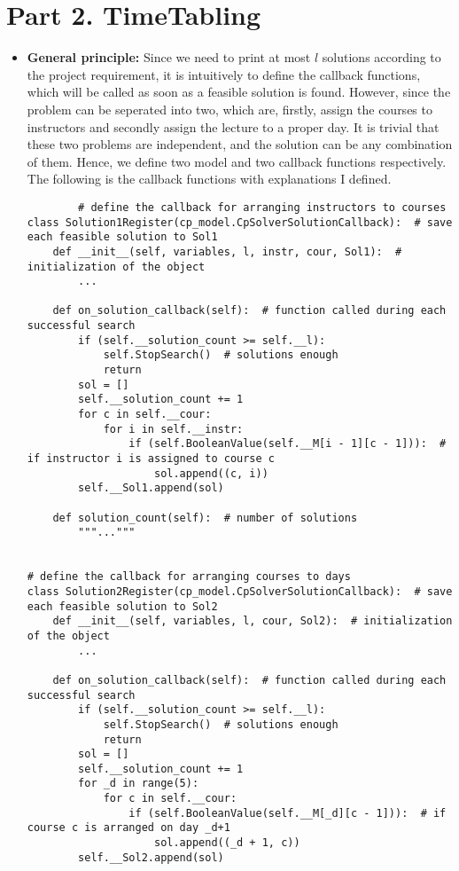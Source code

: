 \documentclass{article}
\begin{document}
\section*{Part 2. TimeTabling}
\begin{itemize}
    \item \textbf{General principle: }Since we need to print at most $l$ solutions according to the project requirement, it is intuitively to define the callback functions, which will be called as soon as a feasible solution is found. However, since the problem can be seperated into two, which are, firstly, assign the courses to instructors and secondly assign the lecture to a proper day. It is trivial that these two problems are independent, and the solution can be any combination of them. Hence, we define two model and two callback functions respectively. The following is the callback functions with explanations I defined. 
    \begin{verbatim}
        # define the callback for arranging instructors to courses
class Solution1Register(cp_model.CpSolverSolutionCallback):  # save each feasible solution to Sol1
    def __init__(self, variables, l, instr, cour, Sol1):  # initialization of the object
        ...

    def on_solution_callback(self):  # function called during each successful search
        if (self.__solution_count >= self.__l):
            self.StopSearch()  # solutions enough
            return
        sol = []
        self.__solution_count += 1
        for c in self.__cour:
            for i in self.__instr:
                if (self.BooleanValue(self.__M[i - 1][c - 1])):  # if instructor i is assigned to course c
                    sol.append((c, i))
        self.__Sol1.append(sol)

    def solution_count(self):  # number of solutions
        """..."""


# define the callback for arranging courses to days
class Solution2Register(cp_model.CpSolverSolutionCallback):  # save each feasible solution to Sol2
    def __init__(self, variables, l, cour, Sol2):  # initialization of the object
        ...

    def on_solution_callback(self):  # function called during each successful search
        if (self.__solution_count >= self.__l):
            self.StopSearch()  # solutions enough
            return
        sol = []
        self.__solution_count += 1
        for _d in range(5):
            for c in self.__cour:
                if (self.BooleanValue(self.__M[_d][c - 1])):  # if course c is arranged on day _d+1
                    sol.append((_d + 1, c))
        self.__Sol2.append(sol)


\end{verbatim}
\end{itemize}
\end{document}
